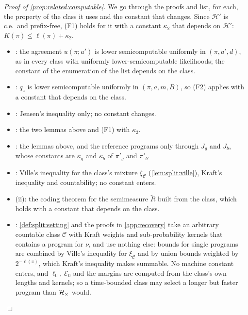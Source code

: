 \begin{proof}[Proof of \cref{prop:related:computable}]
We go through the proofs and list, for each, the property of the class it uses and the constant that changes. Since $\mathcal H'$ is c.e.\ and prefix-free, (F1) holds for it with a constant $\kappa_2$ that depends on $\mathcal H'$: $K(\pi)\le\ell(\pi)+\kappa_2$.
\begin{itemize}[itemsep=0pt]
\item {}: the agreement $u(\pi;a')$ is lower semicomputable uniformly in $(\pi,a',d)$, as in every class with uniformly lower-semicomputable likelihoods; the constant of the enumeration of the list depends on the class.
\item {}: $q_z$ is lower semicomputable uniformly in $(\pi,a,m,B)$, so (F2) applies with a constant that depends on the class.
\item {}: Jensen's inequality only; no constant changes.
\item {}: the two lemmas above and (F1) with $\kappa_2$.
\item {}: the lemmas above, and the reference programs only through $J_g$ and $J_b$, whose constants are $\kappa_g$ and $\kappa_b$ of $\pi'_g$ and $\pi'_b$.
\item {}: Ville's inequality for the class's mixture $\xi_{\mathcal C}$ (\cref{lem:split:ville}), Kraft's inequality and countability; no constant enters.
\item {}(ii): the coding theorem for the semimeasure $\tilde R$ built from the class, which holds with a constant that depends on the class.
\item {}: \cref{def:split:setting} and the proofs in \cref{app:recovery} take an arbitrary countable class $\mathcal C$ with Kraft weights and sub-probability kernels that contains a program for $\nu$, and use nothing else: bounds for single programs are combined by Ville's inequality for $\xi_{\mathcal C}$ and by union bounds weighted by $2^{-\ell(\pi)}$, which Kraft's inequality makes summable. No machine constant enters, and $\ell_0$, $\mathcal E_0$ and the margins are computed from the class's own lengths and kernels; so a time-bounded class may select a longer but faster program than $\mathcal{H}_{\times}$ would.\qedhere
\end{itemize}
\end{proof}

